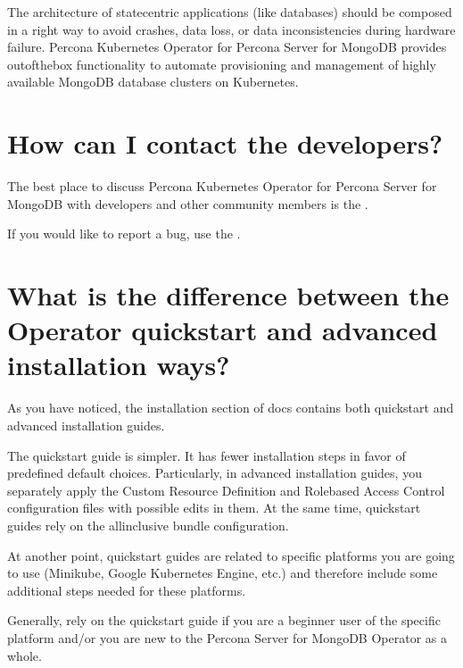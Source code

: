 \documentclass[letterpaper,10pt,english]{sphinxmanual}
\begin{document}
The architecture of state\sphinxhyphen{}centric applications (like databases) should be
composed in a right way to avoid crashes, data loss, or data inconsistencies
during hardware failure. Percona Kubernetes Operator for Percona Server for
MongoDB provides out\sphinxhyphen{}of\sphinxhyphen{}the\sphinxhyphen{}box functionality to automate provisioning and
management of highly available MongoDB database clusters on Kubernetes.


\section{How can I contact the developers?}
\label{\detokenize{faq:how-can-i-contact-the-developers}}
The best place to discuss Percona Kubernetes Operator for Percona Server for
MongoDB with developers and other community members is the .

If you would like to report a bug, use the .


\section{What is the difference between the Operator quickstart and advanced installation ways?}
\label{\detokenize{faq:what-is-the-difference-between-the-operator-quickstart-and-advanced-installation-ways}}
As you have noticed, the installation section of docs contains both quickstart
and advanced installation guides.

The quickstart guide is simpler. It has fewer installation steps in favor of
predefined default choices. Particularly, in advanced installation guides, you
separately apply the Custom Resource Definition and Role\sphinxhyphen{}based Access Control
configuration files with possible edits in them. At the same time, quickstart
guides rely on the all\sphinxhyphen{}inclusive bundle configuration.

At another point, quickstart guides are related to specific platforms you are
going to use (Minikube, Google Kubernetes Engine, etc.) and therefore include
some additional steps needed for these platforms.

Generally, rely on the quickstart guide if you are a beginner user of the
specific platform and/or you are new to the Percona Server for MongoDB Operator
as a whole.
\end{document}
